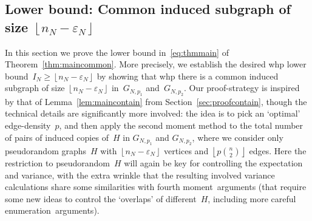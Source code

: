 \documentclass{article}
\newcommand{\eps}{\varepsilon}
\newcommand\floor[1]{\left\lfloor #1 \right \rfloor}
\newcommand{\nN}{n_N}
\begin{document}
\subsection{Lower bound: Common induced subgraph of size $\floor{\nN-\eps_N}$} \label{sec:commonsecond}
In this section we prove the lower bound in~\eqref{eq:thmmain} of Theorem~\ref{thm:maincommon}. 
More precisely, we establish the desired whp lower bound~$I_N \ge \floor{\nN-\eps_N}$ by showing that whp there is a common induced subgraph of size $\floor{\nN-\eps_N}$ in~$G_{N,p_1}$ and~$G_{N,p_2}$.
Our proof-strategy is inspired by that of Lemma~\ref{lem:maincontain} from Section~\ref{sec:proofcontain}, though the technical details are significantly more involved: the idea is to pick an `optimal' edge-density~$p$, and then apply the second moment method to the total number of pairs of induced copies of~$H$ in $G_{N,p_1}$ and $G_{N,p_2}$, where we consider only  pseudorandom graphs~$H$ with $\floor{\nN-\eps_N}$ vertices and $\floor{p\binom{n}{2}}$ edges. 
Here the restriction to pseudorandom~$H$ will again be key for controlling the expectation and variance, 
with the extra wrinkle that the resulting involved variance calculations share some similarities with fourth moment~arguments 
(that require some new ideas to control the `overlaps' of different~$H$, including more careful enumeration~arguments).
\end{document}

